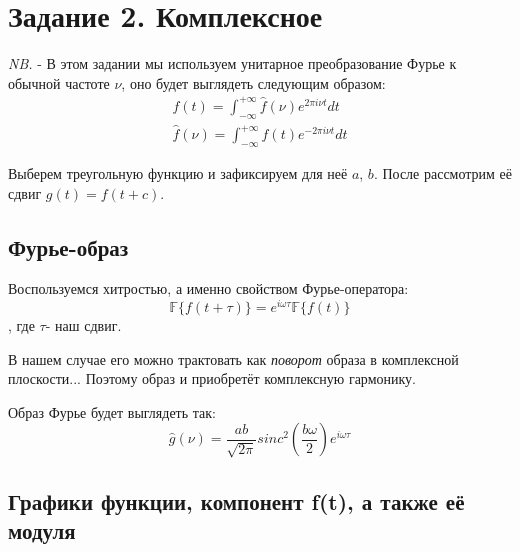 \chapter{Задание 2. Комплексное}
\label{ch:chap3}



\lstset{style=mystyle}

\textit{NB.} - В этом задании мы используем унитарное преобразование Фурье к обычной частоте $\nu$, оно будет выглядеть следующим образом: 
\begin{align*}
    f(t) = \int_{-\infty}^{+\infty}\hat{f}(\nu)e^{2\pi i \nu t}dt \\
    \hat{f}(\nu) = \int_{-\infty}^{+\infty}f(t)e^{-2\pi i \nu t}dt
\end{align*}

Выберем треугольную функцию и зафиксируем для неё  $a$, $b$. После рассмотрим её сдвиг $g(t) = f(t + c)$.

\section{Фурье-образ}

Воспользуемся хитростью, а именно свойством Фурье-оператора:
$$
\mathbb{F}\{f(t+\tau)\} = e^{i \omega\tau}\mathbb{F}\{f(t)\}
$$, где $\tau$- наш сдвиг. 

В нашем случае его можно трактовать как \textit{поворот} образа в комплексной плоскости... Поэтому образ и приобретёт комплексную гармонику.

Образ Фурье будет выглядеть так:
$$
\hat{g}(\nu) = \frac{ab}{\sqrt{2\pi}}sinc^2(\frac{b\omega}{2})e^{i\omega\tau}
$$


\section{Графики функции, компонент f(t), а также её модуля}

